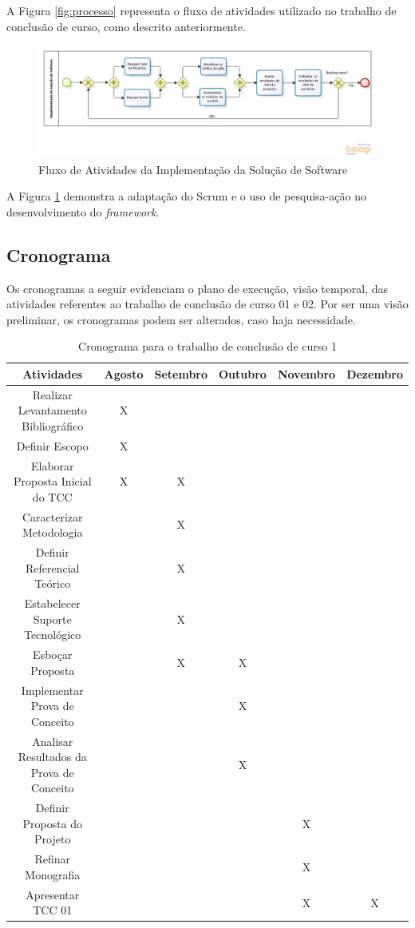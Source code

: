 \par 
\indent A Figura \ref{fig:processo} representa o fluxo de atividades utilizado no trabalho de conclusão de curso, como descrito anteriormente.  
  
    \begin{figure}[h]
    \centering
    \includegraphics[width=\textwidth]{figuras/ProcessoInterno.jpg}
    \caption{Fluxo de Atividades da Implementação da Solução de Software}
    \label{fig:processointerno}
  \end{figure}

\par 
\indent A Figura \ref{fig:processointerno} demonstra a adaptação do Scrum e o uso de pesquisa-ação no desenvolvimento do \textit{framework}. 
 
 \subsection{Cronograma}
 
	Os cronogramas a seguir evidenciam o plano de execução, visão temporal, das atividades referentes ao trabalho de conclusão de curso 01 e 02. Por ser uma visão preliminar, os cronogramas podem ser alterados, caso haja necessidade. 
	  
\begin{table}[h]
  \tiny
  \centering
  \caption{Cronograma para o trabalho de conclusão de curso 1}
  \label{cronograma-tcc-1}
  \begin{tabular}{| c | c | c | c | c | c |}
    \hline
    Atividades & Agosto & Setembro & Outubro & Novembro & Dezembro \\ \hline
    Realizar Levantamento Bibliográfico & X &  &  &  &  \\
    Definir Escopo & X &  &  &  &  \\
    Elaborar Proposta Inicial do TCC & X & X &  &  &  \\
    Caracterizar Metodologia &  & X &  &  &  \\
    Definir Referencial Teórico &  & X &  &  &  \\
    Estabelecer Suporte Tecnológico &  & X &  &  &  \\
    Esboçar Proposta &  & X & X &  &  \\
    Implementar Prova de Conceito &  &  & X &  &  \\
    Analisar Resultados da Prova de Conceito &  &  & X &  &  \\
    Definir Proposta do Projeto &  &  &  & X &  \\
    Refinar Monografia &  &  &  & X &  \\
    Apresentar TCC 01 &  &  &  & X & X \\ \hline
  \end{tabular}
\end{table}
  
